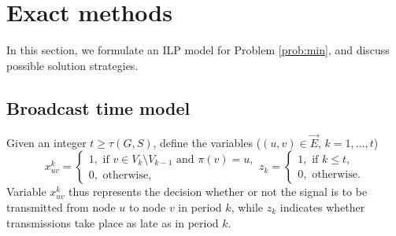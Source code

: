 \section{Exact methods} \label{sec:exact}


In this section, we formulate an ILP model for Problem \ref{prob:min}, and discuss possible solution strategies. 

\subsection{Broadcast time model}
Given an integer $t\geq\tau(G,S)$, define the variables ($(u,v)\in \overrightarrow{E}$, $k=1,\ldots,t$) 
$$ x_{uv}^k=
\begin{cases} 
1, \text{ if } v\in V_k\setminus V_{k-1} \text{ and } \pi(v)=u,\\ 
0, \text{ otherwise},
\end{cases}
z_{k}=\begin{cases}
1, \text{ if } k\leq t,\\
0, \text{ otherwise}.
\end{cases}
$$
\noindent
Variable $x_{uv}^k$ thus represents the decision whether or not the signal is to be transmitted from node $u$ to node $v$ in period $k$,
while $z_k$ indicates whether transmissions take place as late as in period $k$.

